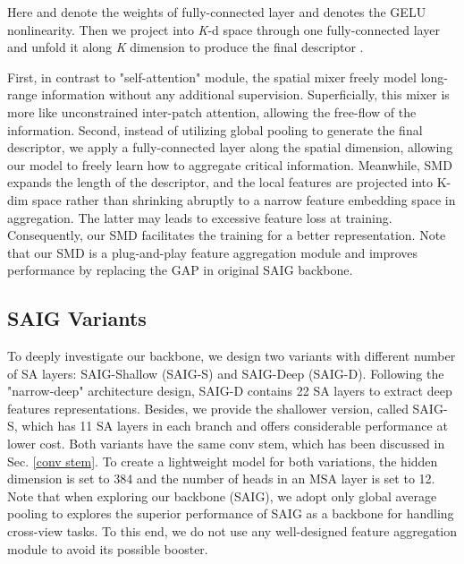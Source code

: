 \documentclass[sn-basic,iicol]{sn-jnl}
\theoremstyle{thmstyletwo}\newtheorem{example}{Example}\newtheorem{remark}{Remark}
\theoremstyle{thmstylethree}\newtheorem{definition}{Definition}
\begin{document}
Here  and  denote the weights of fully-connected layer and  denotes the GELU nonlinearity. Then we project  into \emph{K}-d space through one fully-connected layer and unfold it along \emph{K} dimension to produce the final descriptor .







First, in contrast to "self-attention" module, the spatial mixer freely model long-range information without any additional supervision. Superficially, this mixer is more like unconstrained inter-patch attention, allowing the free-flow of the information. Second, instead of utilizing global pooling to generate the final descriptor, we apply a fully-connected layer along the spatial dimension, allowing our model to freely learn how to aggregate critical information. Meanwhile, SMD expands the length of the descriptor, and the local features are projected into K-dim space rather than shrinking abruptly to a narrow feature embedding space in aggregation. The latter may leads to excessive feature loss at training. Consequently, our SMD facilitates the training for a better representation. Note that our SMD is a plug-and-play feature aggregation module and improves performance by replacing the GAP in original SAIG backbone.



\subsection{SAIG Variants}



To deeply investigate our backbone, we design two variants with different number of SA layers: SAIG-Shallow (SAIG-S) and SAIG-Deep (SAIG-D). Following the "narrow-deep" architecture design, SAIG-D contains 22 SA layers to extract deep features representations. Besides, we provide the shallower version, called SAIG-S, which has 11 SA layers in each branch and offers considerable performance at lower cost. Both variants have the same conv stem, which has been discussed in Sec. \ref{conv stem}. To create a lightweight model for both variations, the hidden dimension is set to 384 and the number of heads in an MSA layer is set to 12. Note that when exploring our backbone (SAIG), we adopt only global average pooling to explores the superior performance of SAIG as a backbone for handling cross-view tasks. To this end, we do not use any well-designed feature aggregation module to avoid its possible booster. 
\end{document}
